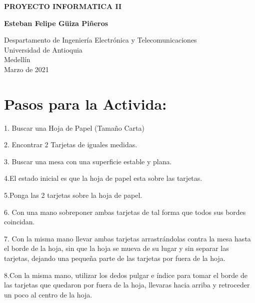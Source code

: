 \documentclass{article}
\begin{document}
\begin{titlepage}
    \begin{center}
        \vspace*{1cm}
            
        \Huge
        \textbf{PROYECTO INFORMATICA II}
            
        \vspace{0.5cm}
        \LARGE
        
            
        \vspace{1.5cm}
            
        \textbf{Esteban Felipe Güiza Piñeros}
            
        \vfill
            
        \vspace{0.8cm}
            
        \Large
        Despartamento de Ingeniería Electrónica y Telecomunicaciones\\
        Universidad de Antioquia\\
        Medellín\\
        Marzo de 2021
            
    \end{center}
\end{titlepage}

\section{Pasos para la Activida:}\dlabel

1. Buscar una Hoja de Papel (Tamaño Carta)


2. Encontrar 2 Tarjetas de iguales medidas.


3. Buscar una mesa con una   superficie estable y plana.


4.El estado inicial es que la hoja de papel esta sobre las tarjetas.

5.Ponga las 2 tarjetas sobre la hoja de papel.

6. Con una mano sobreponer ambas tarjetas de tal forma que todos sus bordes coincidan.

7. Con la misma mano llevar ambas tarjetas arrastrándolas contra la mesa hasta el borde de la hoja, sin que la hoja se mueva de su lugar y sin separar las tarjetas, dejando una pequeña parte de las tarjetas por fuera de la hoja.

8.Con la misma mano, utilizar los dedos pulgar e índice para tomar el borde de las tarjetas   que quedaron por fuera de la hoja, llevaras hacia arriba y retroceder un poco al centro de la hoja.
\end{document}
